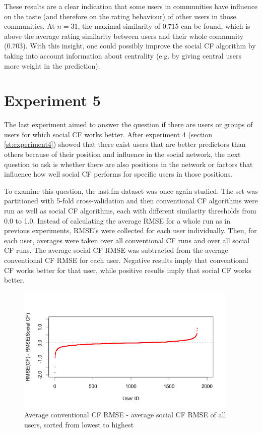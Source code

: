 These results are a clear indication that some users in communities have influence on the taste (and therefore on the rating behaviour) of other users in those communities. At $n=31$, the maximal similarity of 0.715 can be found, which is above the average rating similarity between users and their whole community (0.703). With this insight, one could possibly improve the social CF algorithm by taking into account information about centrality (e.g. by giving central users more weight in the prediction).
\section{Experiment 5}
\label{st:experiment5} The last experiment aimed to answer the question if there are users or groups of users for which social CF works better. After experiment 4 (section \ref{st:experiment4}) showed that there exist users that are better predictors than others because of their position and influence in the social network, the next question to ask is whether there are also positions in the network or factors that influence how well social CF performs for specific users in those positions.
\newline

To examine this question, the last.fm dataset was once again studied. The set was partitioned with 5-fold cross-validation and then conventional CF algorithms were run as well as social CF algorithms, each with different similarity thresholds from 0.0 to 1.0. Instead of calculating the average RMSE for a whole run as in previous experiments, RMSE's were collected for each user individually. Then, for each user, averages were taken over all conventional CF runs and over all social CF runs. The average social CF RMSE was subtracted from the average conventional CF RMSE for each user. Negative results imply that conventional CF works better for that user, while positive results imply that social CF works better. 

\begin{figure}[!h]
\includegraphics[width=400px]{./4-experiments/figures/UserErrors.png}
\caption{Average conventional CF RMSE - average social CF RMSE of all users, sorted from lowest to highest}
\label{f:usererrors}
\end{figure}